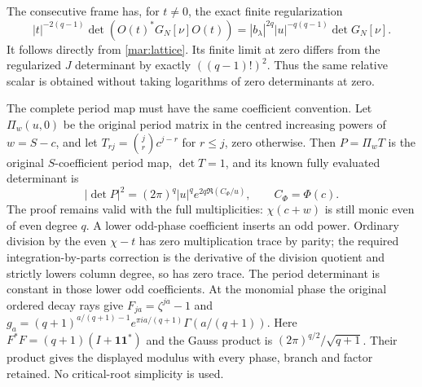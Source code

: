 \documentclass[11pt]{article}
\begin{document}
The consecutive frame has, for $t\ne0$, the exact finite
regularization
\begin{equation}\tag{MAR30}\label{mar:singulargram}
 |t|^{-2(q-1)}\det(O(t)^*G_N[\nu]O(t))
      =|b_\lambda|^{2q}|u|^{-q(q-1)}\det G_N[\nu].
\end{equation}
It follows directly from \eqref{mar:lattice}. Its finite limit
at zero differs from the regularized $J$ determinant by
exactly $((q-1)!)^2$. Thus the same relative scalar is obtained
without taking logarithms of zero determinants at zero.

The complete period map must have the same coefficient convention.
Let $\Pi_w(u,0)$ be the original period matrix in the centred
increasing powers of $w=S-c$, and let
$T_{rj}=\binom jr c^{j-r}$ for $r\le j$, zero otherwise.
Then $P=\Pi_w T$ is the original $S$-coefficient period map,
$\det T=1$, and its known fully evaluated determinant is
\[
 |\det P|^2=(2\pi)^q|u|^q e^{2q\Re(C_\Phi/u)},\qquad
 C_\Phi=\Phi(c).
\]
The proof remains valid with the full multiplicities: $\chi(c+w)$
is still monic even of even degree $q$. A lower odd-phase
coefficient inserts an odd power. Ordinary division by the even
$\chi-t$ has zero multiplication trace by parity; the required
integration-by-parts correction is the derivative of the division
quotient and strictly lowers column degree, so has zero trace.
The period determinant is constant in those lower odd
coefficients. At the monomial phase the original ordered decay
rays give $F_{ja}=\zeta^{ja}-1$ and
$g_a=(q+1)^{a/(q+1)-1}e^{\pi ia/(q+1)}\Gamma(a/(q+1))$.
Here $F^*F=(q+1)(I+\mathbf1\mathbf1^*)$ and the Gauss product
\cite{dlmf} is $(2\pi)^{q/2}/\sqrt{q+1}$. Their product gives
the displayed modulus with every phase, branch and factor
retained. No critical-root simplicity is used.
\end{document}
